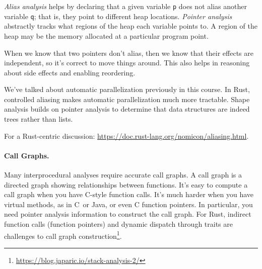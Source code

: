 \documentclass[a4paper]{report}
\newcommand{\CPP}{C\nolinebreak\hspace{-.05em}\raisebox{.4ex}{\tiny\bf +}\nolinebreak\hspace{-.10em}\raisebox{.4ex}{\tiny\bf +}}
\def\CPP{{C\nolinebreak[4]\hspace{-.05em}\raisebox{.4ex}{\tiny\bf ++}}}
\begin{document}
\emph{Alias analysis} helps by declaring that a
given variable {\tt p} does not alias another variable {\tt q}; that
is, they point to different heap locations. \emph{Pointer analysis}
abstractly tracks what regions of the heap each variable points to.
A region of the heap may be the memory allocated at a particular
program point.

When we know that two pointers don't alias, then we know that their
effects are independent, so it's correct to move things around.
This also helps in reasoning about side effects and enabling reordering.

We've talked about automatic parallelization previously in this course.
In Rust, controlled aliasing makes automatic parallelization much more tractable.
Shape analysis
builds on pointer analysis to determine that data structures are indeed
trees rather than lists.

For a Rust-centric discussion: \url{https://doc.rust-lang.org/nomicon/aliasing.html}.

\paragraph{Call Graphs.} Many interprocedural analyses require accurate
call graphs. A call graph is a directed graph showing relationships between
functions. It's easy to compute a call graph when you have C-style
function calls. It's much harder when you have virtual methods, as in
\CPP~or Java, or even C function pointers. In particular, you need pointer
analysis information to construct the call graph. For Rust, indirect function
calls (function pointers) and dynamic dispatch through traits are challenges
to call graph construction\footnote{\url{https://blog.japaric.io/stack-analysis-2/}}.
\end{document}
